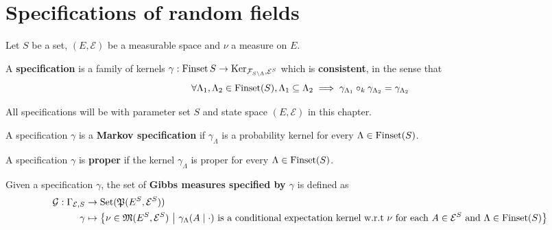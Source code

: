 \chapter{Specifications of random fields}

Let $S$ be a set, $(E, \mathcal{E})$ be a measurable space and $\nu$ a measure on $E$.

\begin{definition}[Specification]
    \label{def:specification}
    \leanok

    A {\bf specification} is a family of kernels $\gamma : \operatorname{Finset} S \to \operatorname{Ker}_{\mathcal{F}_{S\setminus\Lambda}, \mathcal{E}^S}$ which is {\bf consistent}, in the sense that
    $$\forall \Lambda_1, \Lambda_2 \in \operatorname{Finset}(S), \Lambda_1 \subseteq \Lambda_2 \implies \gamma_{\Lambda_1} \circ_k \gamma_{\Lambda_2} = \gamma_{\Lambda_2}$$
\end{definition}

All specifications will be with parameter set $S$ and state space $(E, \mathcal{E})$ in this chapter.

\begin{definition}
    \label{def:markov-specification}
    \leanok

    A specification $\gamma$ is a \textbf{Markov specification} if $\gamma_\Lambda$ is a probability kernel for every $\Lambda \in \operatorname{Finset}(S)$.
\end{definition}

\begin{definition}
    \label{def:proper-specification}
    \leanok

    A specification $\gamma$ is \textbf{proper} if the kernel $\gamma_\Lambda$ is proper for every $\Lambda \in \operatorname{Finset}(S)$.
\end{definition}

\begin{definition}
    \label{def:gibbs-meas}
    \leanok
    Given a specification $\gamma$, the set of \textbf{Gibbs measures specified by $\gamma$} is defined as
    \begin{align}
        \mathcal{G}:\Gamma_{\mathcal{E}, S}&\to\text{Set}(\mathfrak{P}(E^S, \mathcal{E}^S))\\
        \gamma&\mapsto\left\{\nu\in\mathfrak{M}(E^S, \mathcal{E}^S)~\middle\vert~\gamma_\Lambda(A\mid\cdot)~\text{is a conditional expectation kernel w.r.t }\nu\text{ for each } A\in\mathcal{E}^S\text{ and }\Lambda\in\operatorname{Finset}(S)\right\}
    \end{align}
\end{definition}

